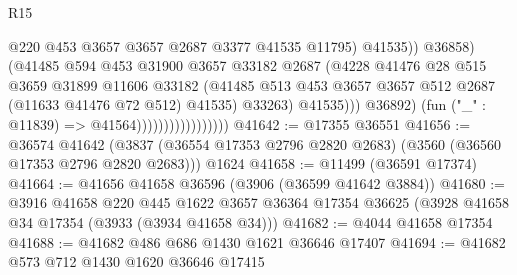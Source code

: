 \begin{lexlean}{R15}
\begin{coremodule}
                                                  @220
                                                  @453
                                                  @3657
                                                  @3657
                                                  @2687
                                                  @3377
                                                  @41535
                                                  @11795)
                                                @41535))
                                            @36858)
                                          (@41485
                                            @594
                                            @453
                                            @31900
                                            @3657
                                            @33182
                                            @2687
                                            (@4228
                                              @41476
                                              @28
                                              @515
                                              @3659
                                              @31899
                                              @11606
                                              @33182
                                              (@41485
                                                @513
                                                @453
                                                @3657
                                                @3657
                                                @512
                                                @2687
                                                (@11633 @41476 @72 @512)
                                                @41535)
                                              @33263)
                                            @41535)))
                                      @36892)
                                    (fun ("_" : @11839) => @41564)))))))))))))))))
@41642 := @17355 @36551
@41656 := @36574
    @41642
    (@3837 (@36554 @17353 @2796 @2820 @2683) (@3560 (@36560 @17353 @2796 @2820 @2683)))
    @1624
@41658 := @11499 (@36591 @17374)
@41664 := @41656 @41658 @36596 (@3906 (@36599 @41642 @3884))
@41680 := @3916
    @41658
    @220
    @445
    @1622
    @3657
    @36364
    @17354
    @36625
    (@3928 @41658 @34 @17354 (@3933 (@3934 @41658 @34)))
@41682 := @4044 @41658 @17354
@41688 := @41682 @486 @686 @1430 @1621 @36646 @17407
@41694 := @41682 @573 @712 @1430 @1620 @36646 @17415

\end{coremodule}
\end{lexlean}
